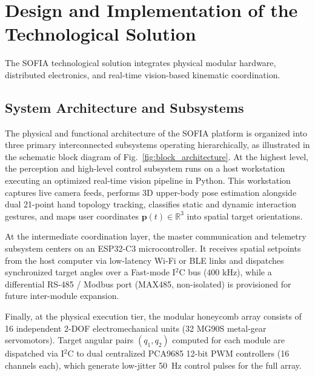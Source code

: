 \documentclass[lettersize,journal]{IEEEtran}
\begin{document}
	
	
	\section{Design and Implementation of the Technological Solution}
	\label{sec:design}
	
	The SOFIA technological solution integrates physical modular hardware, distributed electronics, and real-time vision-based kinematic coordination.
	
	\subsection{System Architecture and Subsystems}
	\label{sec:system_architecture}
	
	The physical and functional architecture of the SOFIA platform is organized into three primary interconnected subsystems operating hierarchically, as illustrated in the schematic block diagram of Fig.~\ref{fig:block_architecture}. At the highest level, the perception and high-level control subsystem runs on a host workstation executing an optimized real-time vision pipeline in Python. This workstation captures live camera feeds, performs 3D upper-body pose estimation alongside dual 21-point hand topology tracking, classifies static and dynamic interaction gestures, and maps user coordinates $\mathbf{p}(t) \in \mathbb{R}^3$ into spatial target orientations.
	
	At the intermediate coordination layer, the master communication and telemetry subsystem centers on an ESP32-C3 microcontroller. It receives spatial setpoints from the host computer via low-latency Wi-Fi or BLE links and dispatches synchronized target angles over a Fast-mode I$^2$C bus ($400\text{ kHz}$), while a differential RS-485 / Modbus port (MAX485, non-isolated) is provisioned for future inter-module expansion.
	
	Finally, at the physical execution tier, the modular honeycomb array consists of 16 independent 2-DOF electromechanical units (32 MG90S metal-gear servomotors). Target angular pairs $(q_1, q_2)$ computed for each module are dispatched via I$^2$C to dual centralized PCA9685 12-bit PWM controllers (16 channels each), which generate low-jitter 50~Hz control pulses for the full array.
	
\end{document}
